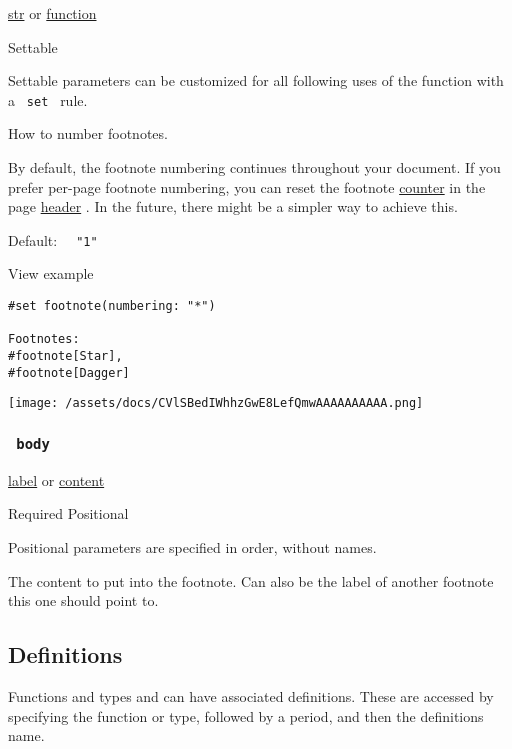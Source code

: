 \href{/docs/reference/foundations/str/}{str} {or}
\href{/docs/reference/foundations/function/}{function}

{{ Settable }}

\label{parameters-numbering-settable-tooltip}
Settable parameters can be customized for all following uses of the
function with a \texttt{\ set\ } rule.

How to number footnotes.

By default, the footnote numbering continues throughout your document.
If you prefer per-page footnote numbering, you can reset the footnote
\href{/docs/reference/introspection/counter/}{counter} in the page
\href{/docs/reference/layout/page/\#parameters-header}{header} . In the
future, there might be a simpler way to achieve this.

Default: \texttt{\ }{\texttt{\ "1"\ }}\texttt{\ }


View example

\begin{verbatim}
#set footnote(numbering: "*")

Footnotes:
#footnote[Star],
#footnote[Dagger]
\end{verbatim}

\texttt{[image: /assets/docs/CVlSBedIWhhzGwE8LefQmwAAAAAAAAAA.png]}

\subsubsection{\texorpdfstring{\texttt{\ body\ }}{ body }}\label{parameters-body}

\href{/docs/reference/foundations/label/}{label} {or}
\href{/docs/reference/foundations/content/}{content}

{Required} {{ Positional }}

\label{parameters-body-positional-tooltip}
Positional parameters are specified in order, without names.

The content to put into the footnote. Can also be the label of another
footnote this one should point to.

\subsection{\texorpdfstring{{ Definitions
}}{ Definitions }}\label{definitions}

\label{definitions-tooltip}
Functions and types and can have associated definitions. These are
accessed by specifying the function or type, followed by a period, and
then the definition\textquotesingle s name.

